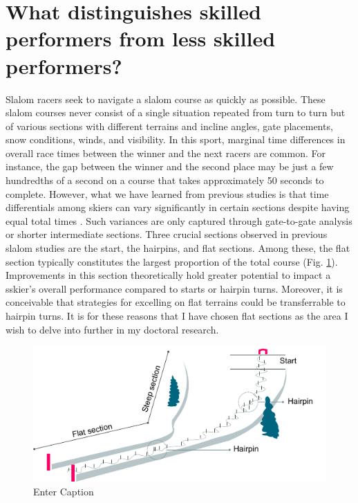
\section{What distinguishes skilled performers from less skilled performers?}
Slalom racers seek to navigate a slalom course as quickly as possible. These slalom courses never consist of a single situation repeated from turn to turn but of various sections with different terrains and incline angles, gate placements, snow conditions, winds, and visibility. In this sport, marginal time differences in overall race times between the winner and the next racers are common. For instance, the gap between the winner and the second place may be just a few hundredths of a second on a course that takes approximately 50 seconds to complete. However, what we have learned from previous studies is that time differentials among skiers can vary significantly in certain sections despite having equal total times \cite{reid_kinematic_2010, supej_relations_2006, supej_differential_2008, federolf_quantifying_2012, supej_new_2011}. Such variances are only captured through gate-to-gate analysis or shorter intermediate sections. Three crucial sections observed in previous slalom studies are the start, the hairpins, and flat sections. Among these, the flat section typically constitutes the largest proportion of the total course (Fig. \ref{fig: flatcourse}). Improvements in this section theoretically hold greater potential to impact a sskier's overall performance compared to starts or hairpin turns. Moreover, it is conceivable that strategies for excelling on flat terrains could be transferrable to hairpin turns. It is for these reasons that I have chosen flat sections as the area I wish to delve into further in my doctoral research.

\begin{figure}
    \centering
    \includegraphics[width=1\linewidth]{figure/figure_introduction_course.pdf}
    \caption{Enter Caption}
    \label{fig: flatcourse}
\end{figure}


